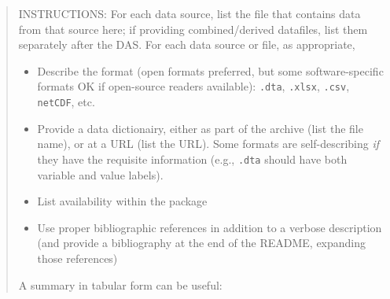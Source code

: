 \documentclass[
]{article}
\providecommand{\tightlist}{%
  \setlength{\itemsep}{0pt}\setlength{\parskip}{0pt}}
\begin{document}
\begin{quote}
INSTRUCTIONS: For each data source, list the file that contains data
from that source here; if providing combined/derived datafiles, list
them separately after the DAS. For each data source or file, as
appropriate,

\begin{itemize}
\tightlist
\item
  Describe the format (open formats preferred, but some
  software-specific formats OK if open-source readers available):
  \texttt{.dta}, \texttt{.xlsx}, \texttt{.csv}, \texttt{netCDF}, etc.
\item
  Provide a data dictionairy, either as part of the archive (list the
  file name), or at a URL (list the URL). Some formats are
  self-describing \emph{if} they have the requisite information (e.g.,
  \texttt{.dta} should have both variable and value labels).
\item
  List availability within the package
\item
  Use proper bibliographic references in addition to a verbose
  description (and provide a bibliography at the end of the README,
  expanding those references)
\end{itemize}

A summary in tabular form can be useful:
\end{quote}
\end{document}
